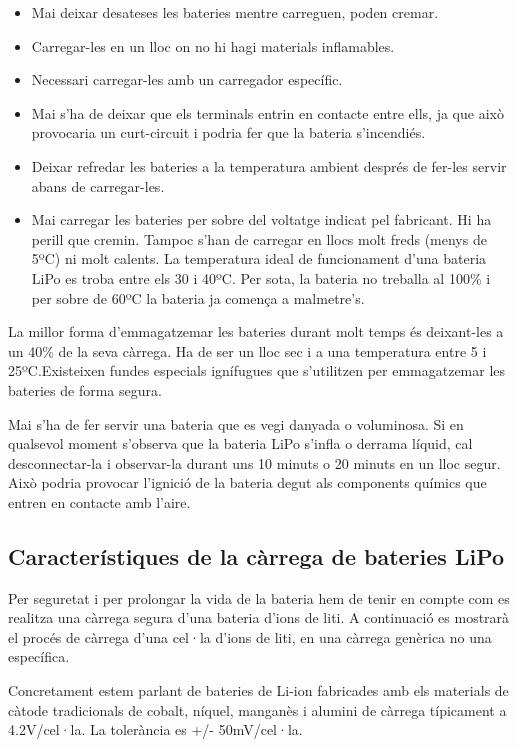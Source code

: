 \begin{itemize}
    \item Mai deixar desateses les bateries mentre carreguen, poden cremar. \item Carregar-les en un lloc on no hi hagi materials inflamables. 
    \item Necessari carregar-les amb un carregador específic.
    \item Mai s'ha de deixar que els terminals entrin en contacte entre ells, ja que això provocaria un curt-circuit i podria fer que la bateria \newline s'incendiés.
    \item Deixar refredar les bateries a la temperatura ambient després de fer-les servir abans de carregar-les.
    \item Mai carregar les bateries per sobre del voltatge indicat pel fabricant. Hi ha perill que cremin. Tampoc s'han de carregar en llocs molt freds (menys de 5ºC) ni molt calents. La temperatura ideal de funcionament d'una bateria LiPo es troba entre els 30 i 40ºC. Per sota, la bateria no treballa al 100\% i per sobre de 60ºC la bateria ja comença a malmetre's. 
\end{itemize}
La millor forma d'emmagatzemar les bateries durant molt temps és deixant-les a un 40\% de la seva càrrega. Ha de ser un lloc sec i a una temperatura entre 5 i 25ºC.Existeixen fundes especials ignífugues que s'utilitzen per emmagatzemar les bateries de forma segura.

Mai s'ha de fer servir una bateria que es vegi danyada o voluminosa. Si en qualsevol moment s'observa que la bateria LiPo s'infla o derrama líquid, cal desconnectar-la i observar-la durant uns 10 minuts o 20 minuts en un lloc segur. Això podria provocar l'ignició de la bateria degut als components químics que entren en contacte amb l'aire.

\subsection{Característiques de la càrrega de bateries LiPo}
Per seguretat i per prolongar la vida de la bateria hem de tenir en compte com es realitza una càrrega segura d'una bateria d'ions de liti. A continuació es mostrarà el procés de càrrega d'una cel·la d'ions de liti, en una càrrega genèrica no una específica.

Concretament estem parlant de bateries de Li-ion fabricades amb els materials de càtode tradicionals de cobalt, níquel, manganès i alumini de càrrega típicament a 4.2V/cel·la. La tolerància es +/- 50mV/cel·la. 

